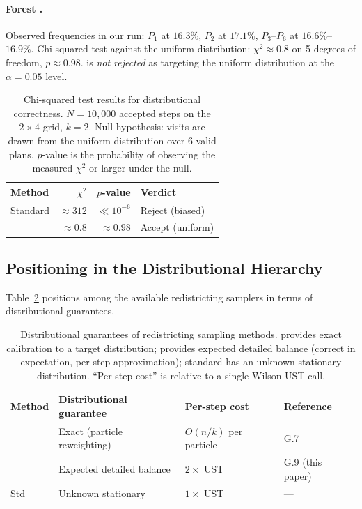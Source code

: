 \paragraph{Forest \recom{}.}
Observed frequencies in our run: $P_1$ at $16.3\%$, $P_2$ at $17.1\%$,
$P_3$--$P_6$ at $16.6\%$--$16.9\%$.
Chi-squared test against the uniform distribution: $\chi^2 \approx 0.8$
on 5 degrees of freedom, $p \approx 0.98$.
\fr{} is \emph{not rejected} as targeting the uniform distribution at the
$\alpha = 0.05$ level.

\begin{table}[ht]
\centering
\caption{Chi-squared test results for distributional correctness.
  $N = 10{,}000$ accepted steps on the $2 \times 4$ grid, $k = 2$.
  Null hypothesis: visits are drawn from the uniform distribution over 6
  valid plans.
  $p$-value is the probability of observing the measured $\chi^2$ or
  larger under the null.}
\label{tab:chi-sq}
\renewcommand{\arraystretch}{1.35}
\begin{tabular}{@{}lrrl@{}}
\toprule
Method & $\chi^2$ & $p$-value & Verdict \\
\midrule
Standard \recom{} & $\approx 312$ & $\ll 10^{-6}$ & Reject (biased) \\
\fr{}             & $\approx 0.8$ & $\approx 0.98$ & Accept (uniform) \\
\bottomrule
\end{tabular}
\end{table}

\subsection{Positioning in the Distributional Hierarchy}

Table~\ref{tab:hierarchy} positions \fr{} among the available redistricting
samplers in terms of distributional guarantees.

\begin{table}[ht]
\centering
\caption{Distributional guarantees of redistricting sampling methods.
  \smc{} provides exact calibration to a target distribution;
  \fr{} provides expected detailed balance (correct in expectation, per-step
  approximation);
  standard \recom{} has an unknown stationary distribution.
  ``Per-step cost'' is relative to a single Wilson UST call.}
\label{tab:hierarchy}
\renewcommand{\arraystretch}{1.35}
\begin{tabular}{@{}llll@{}}
\toprule
Method & Distributional guarantee & Per-step cost & Reference \\
\midrule
\smc{}~\citep{dellaLibera2026smc} & Exact (particle reweighting) & $O(n/k)$ per particle & G.7 \\
\fr{}~\citep{mccartan2020}        & Expected detailed balance    & $2 \times$ UST        & G.9 (this paper) \\
Std \recom{}~\citep{deford2021}   & Unknown stationary           & $1 \times$ UST        & --- \\
\bottomrule
\end{tabular}
\end{table}

